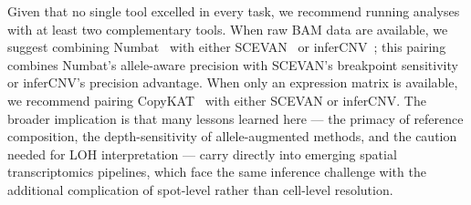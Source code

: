 \documentclass[11pt]{article}
\begin{document}
Given that no single tool excelled in every task, we recommend running
analyses with at least two complementary tools. When raw BAM data are
available, we suggest combining Numbat~\cite{gao2023numbat} with either
SCEVAN~\cite{defalco2023scevan} or inferCNV~\cite{tickle2019infercnv};
this pairing combines Numbat's allele-aware precision with SCEVAN's
breakpoint sensitivity or inferCNV's precision advantage. When only an
expression matrix is available, we recommend pairing
CopyKAT~\cite{gao2021copykat} with either SCEVAN or inferCNV. The broader
implication is that many lessons learned here --- the primacy of reference
composition, the depth-sensitivity of allele-augmented methods, and the
caution needed for LOH interpretation --- carry directly into emerging
spatial transcriptomics pipelines, which face the same inference challenge
with the additional complication of spot-level rather than cell-level
resolution.


\end{document}
